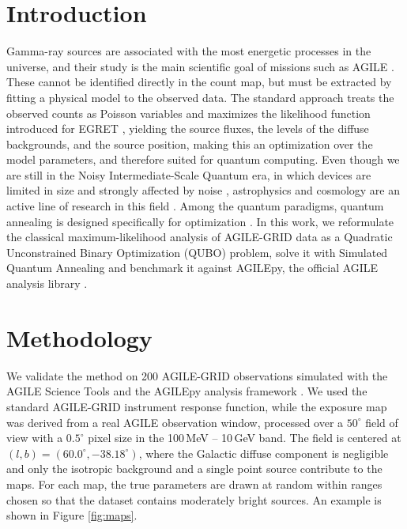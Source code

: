 \documentclass[11pt,twoside]{article}
\begin{document}
\section{Introduction}
Gamma-ray sources are associated with the most energetic processes in the universe, and their study is the main scientific goal of missions such as AGILE \citep{Tavani_2009}. These cannot be identified directly in the count map, but must be extracted by fitting a physical model to the observed data. The standard approach treats the observed counts as Poisson variables and maximizes the likelihood function introduced for EGRET \citep{1996ApJ...461..396M}, yielding the source fluxes, the levels of the diffuse backgrounds, and the source position, making this an optimization over the model parameters, and therefore suited for quantum computing. Even though we are still in the Noisy Intermediate-Scale Quantum era, in which devices are limited in size and strongly affected by noise \citep{Preskill_2018}, astrophysics and cosmology are an active line of research in this field \citep{rizzo2025qcnn, rizzo2026comparing, bulgarelli2026qcinaf}. Among the quantum paradigms, quantum annealing is designed specifically for optimization \citep{annealing}.
In this work, we reformulate the classical maximum-likelihood analysis of AGILE-GRID data as a Quadratic Unconstrained Binary Optimization (QUBO) problem, solve it with Simulated Quantum Annealing and benchmark it against AGILEpy, the official AGILE analysis library \citep{agilepy}.


\section{Methodology}
We validate the method on 200 AGILE-GRID observations simulated with the AGILE Science Tools and the AGILEpy analysis framework \citep{agilepy}. We used the standard AGILE-GRID instrument response function, while the exposure map was derived from a real AGILE observation window, processed over a $50^\circ$ field of view with a $0.5^\circ$ pixel size in the 100\,MeV -- 10\,GeV band. The field is centered at $(l, b) = (60.0^\circ, -38.18^\circ)$, where the Galactic diffuse component is negligible and only the isotropic background and a single point source contribute to the maps. For each map, the true parameters are drawn at random within ranges chosen so that the dataset contains moderately bright sources. An example is shown in Figure \ref{fig:maps}.
\end{document}
